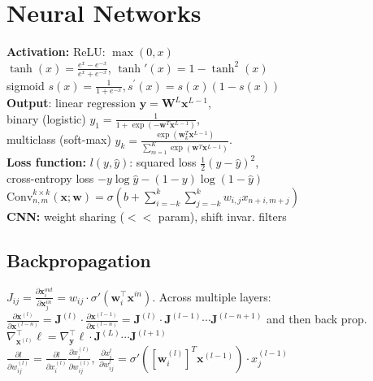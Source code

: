 \section*{Neural Networks}
\textbf{Activation:} ReLU: $\max(0,x)$ \\
$\tanh(x)=\frac{e^x-e^{-x}}{e^x+e^{-x}}$, $\tanh'(x) = 1 - \tanh^2(x)$ \\
sigmoid $s(x)= \frac{1}{1+e^{-x}},s^{'}(x)=s(x)(1-s(x))$\\
\textbf{Output}: linear regression $\mathbf{y} = \mathbf{W}^L\mathbf{x}^{L-1}$, \\binary (logistic) $y_1 = \frac{1}{1 + \exp(-\mathbf{w}^T \mathbf{x}^{L-1})}$, \\multiclass (soft-max) $y_k = \frac{\exp( \mathbf{w}_k^T\mathbf{x}^{L-1})}{\sum_{m=1}^{K}{\exp(\mathbf{w}^T\mathbf{x}^{L-1})}}$.\\
\textbf{Loss function:} $l(y, \hat{y})$: squared loss $\frac{1}{2}(y - \hat{y})^2$, \\
cross-entropy loss $-y \log \hat{y} - (1-y)\log(1-\hat{y})$\\
$\text{Conv}_{n,m}^{k\times k}(\mathbf{x};\mathbf{w})=\sigma \left( b + \sum_{i=-k}^k \sum_{j=-k}^k w_{i,j}x_{n+i,m+j} \right) $\\
\textbf{CNN:} weight sharing ($<<$ param), shift invar. filters

\subsection*{Backpropagation}
$J_{ij} = \frac{\partial \mathbf{x}_i^{out}}{\partial \mathbf{x}_j^{in}} = w_{ij}\cdot\sigma'(\mathbf{w}_i^\top\mathbf{x}^{in})$. Across multiple layers: $\frac{\partial\mathbf{x}^{(l)}}{\partial\mathbf{x}^{(l-n)}} = \mathbf{J}^{(l)}\cdot\frac{\partial\mathbf{x}^{(l-1)}}{\partial\mathbf{x}^{(l-n)}}=\mathbf{J}^{(l)}\cdot\mathbf{J}^{(l-1)}\cdots\mathbf{J}^{(l-n+1)}$ and then back prop. $ \nabla_{\mathbf{x}^{(l)}}^\top\ell=\nabla_{\mathbf{y}}^\top\ell\cdot\mathbf{J}^{(L)}\cdots\mathbf{J}^{(l+1)}$\\
$\frac{\partial l}{\partial w_{ij}^{(l)}} = \frac{\partial l}{\partial x_i^{(l)}}\frac{\partial x_i^{(l)}}{\partial w_{ij}^{(l)}}$, $\frac{\partial x_i^{l}}{\partial w_{ij}^{l}} = \sigma'([\mathbf{w}_i^{(l)}]^T \mathbf{x}^{(l-1)})\cdot x_j^{(l-1)}$ 